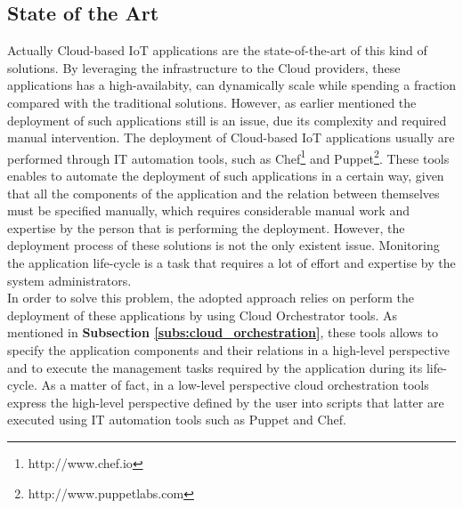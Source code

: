 \subsection{State of the Art}
\label{sub:state_of_art}
Actually Cloud-based IoT applications are the state-of-the-art of this kind of solutions. By leveraging the infrastructure to the Cloud providers, these applications has a high-availabity, can dynamically scale
while spending a fraction compared with the traditional solutions. However, as earlier mentioned the deployment of such applications still is an issue, due its complexity and required manual intervention. The
deployment of Cloud-based IoT applications usually are performed through IT automation tools, such as Chef\footnote{http://www.chef.io} and Puppet\footnote{http://www.puppetlabs.com}. These tools enables to automate the deployment
of such applications in a certain way, given that all the components of the application and the relation between themselves must be specified manually, which requires considerable manual work and expertise by
the person that is performing the deployment. However, the deployment process of these solutions is not the only existent issue. Monitoring the application life-cycle is a task that requires a lot of effort and expertise
by the system administrators.\\

In order to solve this problem, the adopted approach relies on perform the deployment of these applications by using Cloud Orchestrator tools. As mentioned in \textbf{Subsection \ref{subs:cloud_orchestration}}, these
tools allows to specify the application components and their relations in a high-level perspective and to execute the management tasks required by the application during its life-cycle.
As a matter of fact, in a low-level perspective cloud orchestration tools express the high-level perspective defined by the user into scripts that latter are executed using IT automation tools such as Puppet and Chef.
